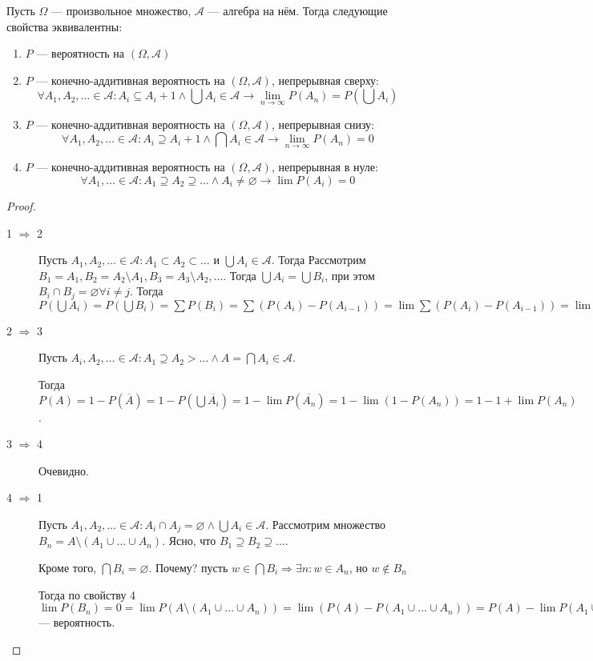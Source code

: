 \begin{Th}
  Пусть $\Omega$ --- произвольное множество, $\mathcal{A} $ --- алгебра на нём. Тогда следующие свойства эквивалентны:
  \begin{enumerate}
	\item $P$ --- вероятность на $(\Omega, \mathcal{A})$
	\item $P$ --- конечно-аддитивная вероятность на $(\Omega, \mathcal{A})$, непрерывная сверху: 
	  \[
		\forall A_1, A_2, \ldots \in \mathcal{A}:  A_i \subseteq A_i+1 \wedge \bigcup A_i \in \mathcal{A} \to \lim\limits_{n\to\infty} P(A_n) = P(\bigcup A_i)
	  \]
	\item $P$ --- конечно-аддитивная вероятность на $(\Omega, \mathcal{A})$, непрерывная снизу:
	  \[
	   \forall A_1, A_2, \ldots \in \mathcal{A}:  A_i \supseteq A_i+1 \wedge \bigcap A_i \in \mathcal{A} \to \lim\limits_{n\to\infty} P(A_n) = 0
	  \]
	\item $P$ --- конечно-аддитивная вероятность на $(\Omega, \mathcal{A})$, непрерывная в нуле:
	  \[
		\forall A_1, \ldots \in \mathcal{A}: A_1 \supseteq A_2 \supseteq \ldots \wedge A_i \neq \varnothing \to \lim P(A_i) = 0
	  \]
  \end{enumerate}

  \begin{proof} $ $
	\begin{description}
	  \item [1 $\Rightarrow$ 2] Пусть $A_1, A_2, \ldots \in \mathcal{A}: A_1 \subset A_2 \subset \ldots$ и $\bigcup A_i \in \mathcal{A} $. 
		Тогда Рассмотрим $B_1 = A_1, B_2 = A_2\setminus A_1, B_3 = A_3 \setminus A_2, \ldots$. Тогда $\bigcup A_i = \bigcup B_i$,
		при этом $B_i \cap B_j = \varnothing \forall i \neq j$. Тогда $P(\bigcup A_i) = P(\bigcup B_i) = 
		\sum P(B_i) = \sum (P(A_i) - P(A_{i-1})) = \lim \sum (P(A_i) - P(A_{i-1})) = \lim P(A_i)$
	  \item [2 $\Rightarrow$ 3] Пусть $A_i, A_2, \ldots \in \mathcal{A}: A_1 \supseteq A_2 > \ldots \wedge A = \bigcap A_i \in \mathcal{A}$.

		Тогда $P(A) = 1 - P(\overline{A}) = 1 - P(\bigcup \overline{A_i}) = 1 - \lim P(\overline{A_n}) = 1 - \lim (1 - P(A_n)) = 1 - 1 + \lim P(A_n)$.
	  \item [3 $\Rightarrow$ 4] Очевидно.
	  \item [4 $\Rightarrow$ 1] Пусть $A_1, A_2, \ldots \in \mathcal{A}: A_i \cap A_j = \varnothing \wedge \bigcup A_i \in \mathcal{A}$.
		Рассмотрим множество $B_n = A \setminus (A_1 \cup \ldots \cup A_n)$. Ясно, что $B_1 \supseteq B_2 \supseteq \ldots$. 
		
		Кроме того, $\bigcap B_i = \varnothing$. Почему? пусть $w \in \bigcap B_i \Rightarrow \exists n : w \in A_n$, но $w \not\in B_n$
		
		Тогда по свойству 4 $\lim P(B_n) = 0 = \lim P(A\setminus (A_1 \cup \ldots \cup A_n)) = \lim (P(A) - P(A_1 \cup \ldots \cup A_n)) =
		P(A) - \lim P(A_1 \cup \ldots \cup A_n) = P(A) - \lim \sum P(A_i) = P(A) - \sum P(A_i) \Rightarrow P$ --- вероятность.
	\end{description}
  \end{proof}
\end{Th}


